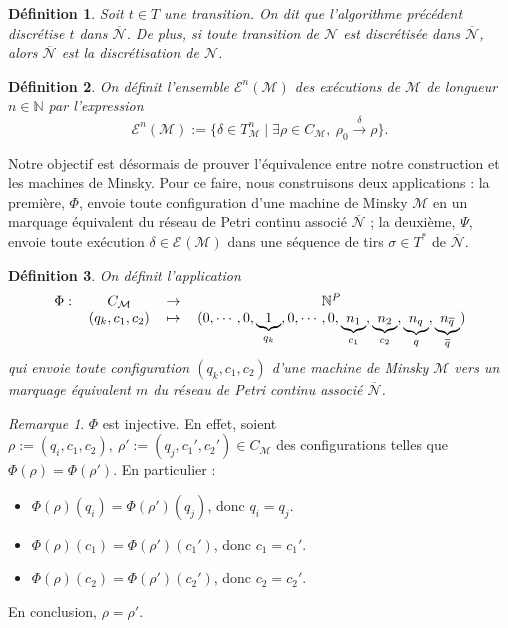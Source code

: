 \documentclass{article}
\newtheorem{definition}{Définition}
\theoremstyle{remark}
\newtheorem*{remark}{Remarque}
\theoremstyle{remark}
\newcommand{\reaches}[1][]{\xrightarrow{#1}}
\newcommand{\function}[5]{
    \begin{tabular}{r c c c}
         $#1 :$ & $#2$ & $\rightarrow$ & $#3$ \\
                & $#4$ &   $\mapsto$   & $#5$
    \end{tabular}
}
\newcommand{\runs}[2][]{\mathcal{E}^{#1}(\mathcal{#2})}
\begin{document}
\begin{definition}
    Soit $t \in  T$ une transition. On dit que l'algorithme précédent discrétise $t$ dans $\overline{\mathcal{N}}$. De plus, si toute transition de $\mathcal{N}$ est discrétisée dans $\overline{\mathcal{N}}$, alors $\overline{\mathcal{N}}$ est la discrétisation de $\mathcal{N}$.
\end{definition}

\begin{definition}
    On définit l'ensemble $\runs[n]{\mathcal{M}}$ des exécutions de $\mathcal{M}$ de longueur $n \in \mathbb{N}$ par l'expression
    \[\runs[n]{\mathcal{M}} := \{\delta \in T_{\mathcal{M}}^n \mid \exists \rho \in C_{\mathcal{M}},\ \rho_0 \reaches[\delta] \rho\}.\]
\end{definition}

Notre objectif est désormais de prouver l'équivalence entre notre construction et les machines de Minsky. Pour ce faire, nous construisons deux applications : la première, $\Phi$, envoie toute configuration d'une machine de Minsky $\mathcal{M}$ en un marquage équivalent du réseau de Petri continu associé $\overline{\mathcal{N}}$ ; la deuxième, $\Psi$, envoie toute exécution $\delta \in \runs{M}$ dans une séquence de tirs $\sigma \in T^*$ de $\overline{\mathcal{N}}$.

\begin{definition}
    On définit l'application \[
        \function{\Phi}{C_{\mathcal{M}}}{\mathbb{N}^P}{(q_k, c_1, c_2)}{(0, \cdots, 0, \underbrace{1}_{q_k}, 0, \cdots, 0, \underbrace{n_1}_{c_1}, \underbrace{n_2}_{c_2}, \underbrace{n_q}_q, \underbrace{n_{\overline{q}}}_{\overline{q}})}
    \]
    qui envoie toute configuration $(q_k, c_1, c_2)$ d'une machine de Minsky $\mathcal{M}$ vers un marquage équivalent $m$ du réseau de Petri continu associé $\overline{\mathcal{N}}$.
\end{definition}

\begin{remark}
    $\Phi$ est injective. En effet, soient $\rho := (q_i, c_1, c_2),\ \rho' := (q_j, c_1', c_2') \in C_{\mathcal{M}}$ des configurations telles que $\Phi(\rho) = \Phi(\rho')$. En particulier : \begin{itemize}
        \item $\Phi(\rho)(q_i) = \Phi(\rho')(q_j)$, donc $q_i = q_j$.
        \item $\Phi(\rho)(c_1) = \Phi(\rho')(c_1')$, donc $c_1 = c_1'$.
        \item $\Phi(\rho)(c_2) = \Phi(\rho')(c_2')$, donc $c_2 = c_2'$.
    \end{itemize}
    En conclusion, $\rho = \rho'$.
\end{remark}
\end{document}
